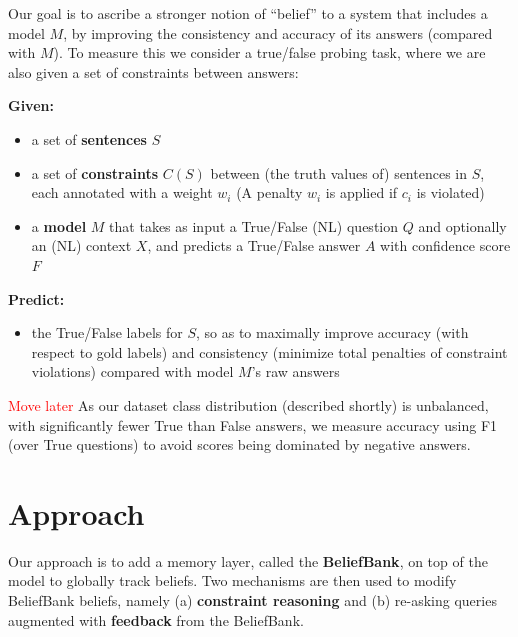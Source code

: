 \documentclass[11pt]{article}
\newcommand{\red}[1]{\textcolor{red}{#1}}
\newenvironment{myquote}{                   %
  \parskip 0mm \begin{quoting}[vskip=0mm,leftmargin=2mm]}{
\end{quoting}}
\newenvironment{ite}{                     %
     \parskip 0cm \begin{itemize} \parskip 0cm \parsep 0cm \itemsep 0cm \topsep 0cm}{
        \end{itemize}} %
\begin{document}
Our goal is to ascribe a stronger notion of ``belief'' to a system that includes a model $M$,
by improving the consistency and accuracy of its answers (compared with $M$). To measure
this we consider a true/false probing task, where we are also given a set of
constraints between answers:
\begin{myquote}
{\bf Given:}
\begin{ite}
\item a set of {\bf sentences} $S$ 
\item a set of {\bf constraints} $C(S)$ between (the truth values of) sentences in $S$, each annotated with a weight $w_i$ (A penalty $w_i$ is applied if $c_i$ is violated)
\item a {\bf model} $M$ that takes as input a True/False (NL) question $Q$ and optionally an (NL) context $X$, and predicts a True/False answer $A$ with confidence score $F$
\end{ite}
{\bf Predict:}
\begin{ite}
\item the True/False labels for $S$, so as to maximally improve accuracy (with respect to gold labels) and
   consistency (minimize total penalties of constraint violations) compared with model $M$'s raw answers
\end{ite}
\end{myquote}
\red{Move later} As our dataset class distribution (described shortly) is unbalanced, with significantly fewer True than False
answers, we measure accuracy using F1 (over True questions) to avoid scores being dominated by negative
answers.



\section{Approach}

Our approach is to add a
memory layer, called the {\bf BeliefBank}, on top of the model to globally 
track beliefs. Two mechanisms are then used to modify BeliefBank beliefs, namely
(a) {\bf constraint reasoning} and (b) re-asking queries augmented with {\bf feedback} from the BeliefBank.
\end{document}
